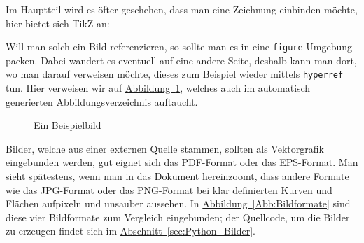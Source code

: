 \documentclass[12pt]{article}
\theoremstyle{definition}
\numberwithin{equation}{section}
\begin{document}
Im Hauptteil wird es öfter geschehen, dass man eine Zeichnung
einbinden möchte, hier bietet sich TikZ an:
\begin{center}
\end{center}
Will man solch ein Bild referenzieren, so sollte man es in eine
\texttt{figure}-Umgebung packen. Dabei wandert es eventuell auf eine
andere Seite, deshalb kann man dort, wo man darauf verweisen möchte,
dieses zum Beispiel wieder mittels \texttt{hyperref} tun. Hier
verweisen wir auf
\hyperref[Abb:EinBeispielbild]{Abbildung~\ref*{Abb:EinBeispielbild}},
welches auch im automatisch generierten Abbildungsverzeichnis
auftaucht.
\begin{figure}[htb]
  \centering
  \caption{Ein Beispielbild}
  \label{Abb:EinBeispielbild}
\end{figure}
Bilder, welche aus einer externen Quelle stammen, sollten als
Vektorgrafik eingebunden werden, gut eignet sich das
\hyperref[Abb:PDF]{PDF-Format} oder das
\hyperref[Abb:EPS]{EPS-Format}. Man sieht spätestens, wenn man in das
Dokument hereinzoomt, dass andere Formate wie das
\hyperref[Abb:JPG]{JPG-Format} oder das \hyperref[Abb:PNG]{PNG-Format}
bei klar definierten Kurven und Flächen aufpixeln und unsauber
aussehen. In
\hyperref[Abb:Bildformate]{Abbildung~\ref*{Abb:Bildformate}} sind
diese vier Bildformate zum Vergleich eingebunden; der Quellcode, um
die Bilder zu erzeugen findet sich im
\hyperref[sec:Python_Bilder]{Abschnitt~\ref*{sec:Python_Bilder}}.
\end{document}
